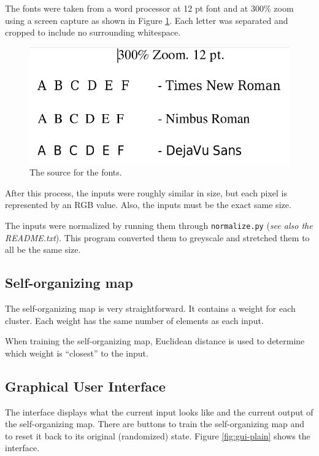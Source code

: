 \documentclass[12pt,letterpaper,oneside]{report}
\newcommand \code[1]{\texttt{#1}}
\newcommand \qq[1]{``{#1}''}
\begin{document}
The fonts were taken from a word processor at 12 pt font and at 300\% zoom using a screen capture as shown in Figure \ref{fig:font-screengrab}. Each letter was separated and cropped to include no surrounding whitespace.

\begin{figure}[ht]
  \centering
  \includegraphics[width=5in]{diagrams/font-screengrab.png}
  \caption{The source for the fonts.}
  \label{fig:font-screengrab}
\end{figure}

After this process, the inputs were roughly similar in size, but each pixel is represented by an RGB value. Also, the inputs must be the exact same size.

The inputs were normalized by running them through \code{normalize.py} (\textit{see also the README.txt}). This program converted them to greyscale and stretched them to all be the same size.


\subsection{Self-organizing map}
The self-organizing map is very straightforward. It contains a weight for each cluster. Each weight has the same number of elements as each input.

When training the self-organizing map, Euclidean distance is used to determine which weight is \qq{closest} to the input.


\subsection{Graphical User Interface}
The interface displays what the current input looks like and the current output of the self-organizing map. There are buttons to train the self-organizing map and to reset it back to its original (randomized) state. Figure \ref{fig:gui-plain} shows the interface.
\end{document}
